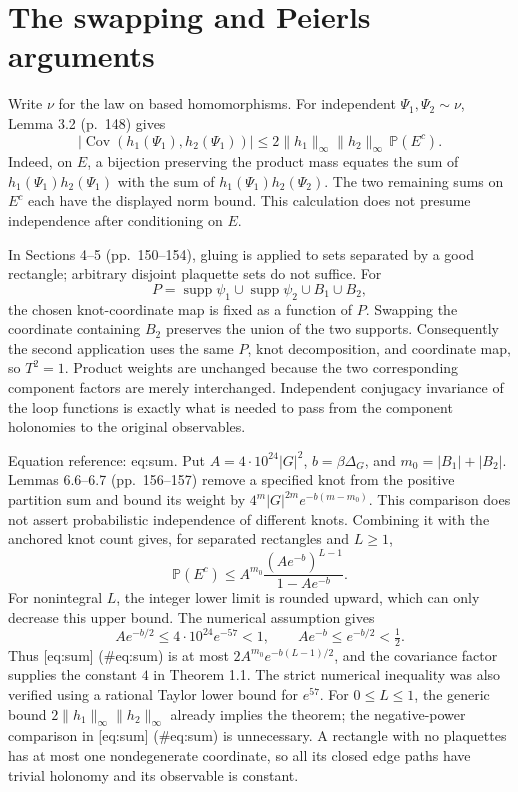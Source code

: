 \documentclass[10pt]{article}
\begin{document}
\section*{The swapping and Peierls arguments}
Write \(\nu\) for the law on based homomorphisms. For independent \(\Psi_1,\Psi_2\sim\nu\), Lemma 3.2 (p. 148) gives \[|\operatorname{Cov}(h_1(\Psi_1),h_2(\Psi_1))|
 \le 2\|h_1\|_\infty\|h_2\|_\infty\,\mathbb P(E^c).\] Indeed, on \(E\), a bijection preserving the product mass equates the sum of \(h_1(\Psi_1)h_2(\Psi_1)\) with the sum of \(h_1(\Psi_1)h_2(\Psi_2)\). The two remaining sums on \(E^c\) each have the displayed norm bound. This calculation does not presume independence after conditioning on \(E\).\par
In Sections 4–5 (pp. 150–154), gluing is applied to sets separated by a good rectangle; arbitrary disjoint plaquette sets do not suffice. For \[P=\operatorname{supp}\psi_1\cup\operatorname{supp}\psi_2\cup B_1\cup B_2,\] the chosen knot-coordinate map is fixed as a function of \(P\). Swapping the coordinate containing \(B_2\) preserves the union of the two supports. Consequently the second application uses the same \(P\), knot decomposition, and coordinate map, so \(T^2=1\). Product weights are unchanged because the two corresponding component factors are merely interchanged. Independent conjugacy invariance of the loop functions is exactly what is needed to pass from the component holonomies to the original observables.\par
Equation reference: eq:sum. Put \(A=4\cdot10^{24}|G|^2\), \(b=\beta\Delta_G\), and \(m_0=|B_1|+|B_2|\). Lemmas 6.6–6.7 (pp. 156–157) remove a specified knot from the positive partition sum and bound its weight by \(4^m|G|^{2m}e^{-b(m-m_0)}\). This comparison does not assert probabilistic independence of different knots. Combining it with the anchored knot count gives, for separated rectangles and \(L\ge1\), \[
 \mathbb P(E^c)\le A^{m_0}\frac{(Ae^{-b})^{L-1}}{1-Ae^{-b}}.\] For nonintegral \(L\), the integer lower limit is rounded upward, which can only decrease this upper bound. The numerical assumption gives \[Ae^{-b/2}\le4\cdot10^{24}e^{-57}<1,\qquad
 Ae^{-b}\le e^{-b/2}<\tfrac12 .\] Thus [eq:sum] (\#eq:sum) is at most \(2A^{m_0}e^{-b(L-1)/2}\), and the covariance factor supplies the constant \(4\) in Theorem 1.1. The strict numerical inequality was also verified using a rational Taylor lower bound for \(e^{57}\). For \(0\le L\le1\), the generic bound \(2\|h_1\|_\infty\|h_2\|_\infty\) already implies the theorem; the negative-power comparison in [eq:sum] (\#eq:sum) is unnecessary. A rectangle with no plaquettes has at most one nondegenerate coordinate, so all its closed edge paths have trivial holonomy and its observable is constant.\par
\end{document}

